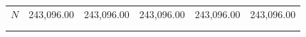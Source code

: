 \begin{center}
\begin{tabular}{lccccc}
\noalign{\smallskip}$N$ & 243,096.00 & 243,096.00 & 243,096.00 & 243,096.00 & 243,096.00\\
 & \begin{footnotesize}\end{footnotesize} & \begin{footnotesize}\end{footnotesize} & \begin{footnotesize}\end{footnotesize} & \begin{footnotesize}\end{footnotesize} & \begin{footnotesize}\end{footnotesize}\\
\noalign{\smallskip}\hline\end{tabular}\\
\end{center}
